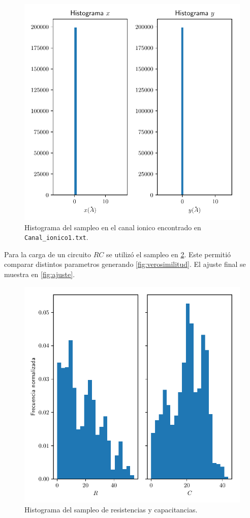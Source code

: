 \documentclass[a4paper]{article}
\begin{document}
	\begin{figure}
		\includegraphics{histograma_2.pdf}
		\caption{Histograma del sampleo en el canal ionico encontrado en \texttt{Canal\_ionico1.txt}.}
		\label{fig:hist2}
	\end{figure}

Para la carga de un circuito $RC$ se utiliz\'o el sampleo en \ref{fig:hist3}. Este permiti\'o comparar distintos parametros generando \ref{fig:verosimilitud}. El ajuste final se muestra en \ref{fig:ajuste}.

	\begin{figure}
		\includegraphics{histograma_3.pdf}
		\caption{Histograma del sampleo de resistencias y capacitancias.}
		\label{fig:hist3}
	\end{figure}
\end{document}
